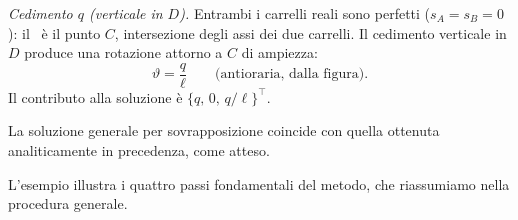 \begin{esempio}
\begin{svolgimento}
		\smallskip
		\noindent\textit{Cedimento $q$ (verticale in $D$).}
		Entrambi i carrelli reali sono perfetti ($s_A = s_B =
		0$): il \CRa\ è il punto $C$, intersezione degli assi
		dei due carrelli. Il cedimento verticale in $D$ produce
		una rotazione attorno a $C$ di ampiezza:
		\begin{equation*}
			\vartheta = \frac{q}{\ell} \qquad
			\text{(antioraria, dalla figura)}.
		\end{equation*}
		Il contributo alla soluzione è
		$\{q,\, 0,\, q/\ell\}^\top$.
		
		
		



		
		\smallskip
		La soluzione generale per sovrapposizione coincide con quella ottenuta analiticamente in precedenza, come atteso.
		
	\end{svolgimento}
\end{esempio}

L'esempio illustra i quattro passi fondamentali del metodo,
che riassumiamo nella procedura generale.

